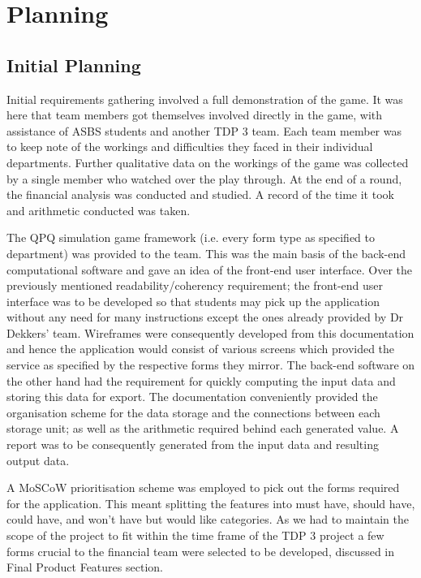 \documentclass{l3proj}
\begin{document}
\section{Planning}
\label{sec:planning}

\subsection{Initial Planning}
Initial requirements gathering involved a full demonstration of the game. It was here that team members got themselves involved directly in the game, with assistance of ASBS students and another TDP 3 team. Each team member was to keep note of the workings and difficulties they faced in their individual departments. Further qualitative data on the workings of the game was collected by a single member who watched over the play through. At the end of a round, the financial analysis was conducted and studied. A record of the time it took and arithmetic conducted was taken.

The QPQ simulation game framework (i.e. every form type as specified to department) was provided to the team. This was the main basis of the back-end computational software and gave an idea of the front-end user interface. Over the previously mentioned readability/coherency requirement; the front-end user interface was to be developed so that students may pick up the application without any need for many instructions except the ones already provided by Dr Dekkers' team. Wireframes were consequently developed from this documentation and hence the application would consist of various screens which provided the service as specified by the respective forms they mirror. The back-end software on the other hand had the requirement for quickly computing the input data and storing this data for export. The documentation conveniently provided the organisation scheme for the data storage and the connections between each storage unit; as well as the arithmetic required behind each generated value. A report was to be consequently generated from the input data and resulting output data.
    
A MoSCoW prioritisation scheme was employed to pick out the forms required for the application. This meant splitting the features into must have, should have, could have, and won't have but would like categories. As we had to maintain the scope of the project to fit within the time frame of the TDP 3 project a few forms crucial to the financial team were selected to be developed, discussed in Final Product Features section.
\end{document}
